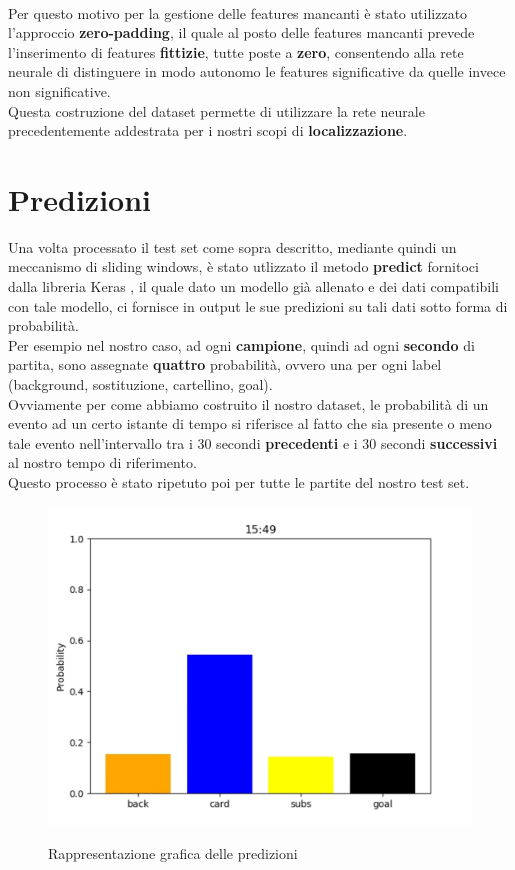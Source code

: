 \\Per questo motivo per la gestione delle features mancanti è stato utilizzato l'approccio \textbf{zero-padding}, il quale al posto delle features mancanti prevede l'inserimento di features \textbf{fittizie}, tutte poste a \textbf{zero}, consentendo alla rete neurale di distinguere in modo autonomo le features significative da quelle invece non significative.
\\Questa costruzione del dataset permette di utilizzare la rete neurale precedentemente addestrata per i nostri scopi di \textbf{localizzazione}.
\section{Predizioni}
Una volta processato il test set come sopra descritto, mediante quindi un meccanismo di sliding windows, è stato utlizzato il metodo \textbf{predict} fornitoci dalla libreria Keras \cite{chollet2015keras}, il quale dato un modello già allenato e dei dati compatibili con tale modello, ci fornisce in output le sue predizioni su tali dati sotto forma di probabilità. 
\\Per esempio nel nostro caso, ad ogni \textbf{campione}, quindi ad ogni \textbf{secondo} di partita, sono assegnate \textbf{quattro} probabilità, ovvero una per ogni label (background, sostituzione, cartellino, goal).
\\Ovviamente per come abbiamo costruito il nostro dataset, le probabilità di un evento ad un certo istante di tempo si riferisce al fatto che sia presente o meno tale evento nell'intervallo tra i 30 secondi \textbf{precedenti} e i 30 secondi \textbf{successivi} al nostro tempo di riferimento.
\\Questo processo è stato ripetuto poi per tutte le partite del nostro test set.
\begin{figure}[H]
\centering
\caption{Rappresentazione grafica delle predizioni}
\includegraphics[scale=0.22]{img/predict.png}
\label{figure : predict}
\end{figure}
